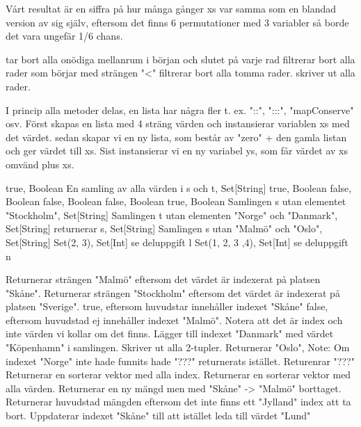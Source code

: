 Vårt resultat är en siffra på hur många gånger xs var samma som en blandad version av sig själv, eftersom det finns 6 permutationer med 3 variabler så borde det vara ungefär 1/6 chans.

\Subtask 
{} tar bort alla onödiga mellanrum i början och slutet på varje rad
 filtrerar bort alla rader som börjar med strängen "<"
 filtrerar bort alla tomma rader.
 skriver ut alla rader.

\Task %
\Subtask 
I princip alla metoder delas, en lista har några fler t. ex. "::", ":::", "mapConserve" osv.
\Subtask 
Först skapas en lista med 4 sträng värden och instansierar variablen xs med det värdet.
sedan skapar vi en ny lista, som består av "zero" + den gamla listan och ger värdet till xs.
Sist instansierar vi en ny variabel ys, som får värdet av xs omvänd plus xs.

\Task %
\Subtask 
true, Boolean
\Subtask 
En samling av alla värden i s och t, Set[String]
\Subtask 
true, Boolean
\Subtask 
false, Boolean
\Subtask 
false, Boolean
\Subtask 
false, Boolean
\Subtask 
true, Boolean
\Subtask 
Samlingen s utan elementet "Stockholm", Set[String]
\Subtask 
Samlingen t utan elementen "Norge" och "Danmark", Set[String]
\Subtask 
returnerar s, Set[String]
\Subtask 
Samlingen s utan "Malmö" och "Oslo", Set[String]
\Subtask 
Set(2, 3), Set[Int]
\Subtask 
se deluppgift l
\Subtask 
Set(1, 2, 3 ,4), Set[Int]
\Subtask 
se deluppgift n

\Task %
\Subtask 
Returnerar strängen "Malmö" eftersom det värdet är indexerat på platsen "Skåne".
\Subtask 
Returnerar strängen "Stockholm" eftersom det värdet är indexerat på platsen "Sverige".
\Subtask 
true, eftersom huvudstar innehåller indexet "Skåne"
\Subtask 
false, eftersom huvudstad ej innehåller indexet "Malmö". Notera att det är index och inte värden vi kollar om det finns.
\Subtask 
Lägger till indexet "Danmark" med värdet "Köpenhamn" i samlingen.
\Subtask 
Skriver ut alla 2-tupler.
\Subtask 
Returnerar "Oslo", Note: Om indexet "Norge" inte hade funnits hade "???" returnerats istället.
\Subtask 
Returenrar "???"
\Subtask 
Returnerar en sorterar vektor med alla index.
\Subtask 
Returnerar en sorterar vektor med alla värden.
\Subtask 
Returnerar en ny mängd men med "Skåne" -> "Malmö" borttaget. 
\Subtask 
Returnerar huvudstad mängden eftersom det inte finns ett "Jylland" index att ta bort.
\Subtask 
Uppdaterar indexet "Skåne" till att istället leda till värdet "Lund"

